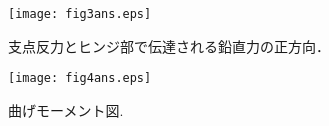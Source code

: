 ﻿\documentclass[10pt,a4j]{jarticle}
\begin{document}
\begin{figure}[h]
	\begin{center}
	\texttt{[image: fig3ans.eps]} 
	\end{center}
	\caption{
		支点反力とヒンジ部で伝達される鉛直力の正方向．
		} 
	\label{fig:fig3}
\end{figure}
\begin{figure}[h]
	\begin{center}
	\texttt{[image: fig4ans.eps]} 
	\end{center}
	\caption{
		曲げモーメント図.} 
	\label{fig:fig4}
\end{figure}
\end{document}
